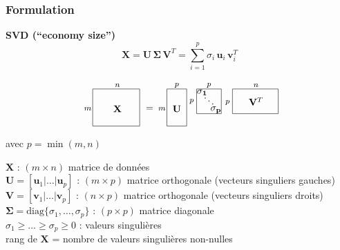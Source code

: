 \documentclass[9pt]{beamer}
\begin{document}
\begin{frame}
\frametitle{Formulation}

\begin{tcolorbox}
\textbf{SVD (``economy size'')}
$$
\mathbf{X} = \mathbf{U} \, \bm{\Sigma} \, \mathbf{V}^T = \sum_{i=1}^p \sigma_i \, \mathbf{u}_i \,  \mathbf{v}_i^T
$$

\[
\raisebox{-0.35\height}{\begin{tikzpicture}[scale=0.9]
\draw(-3,0.7) node (A) {$\mathbf{X}$};
\draw(-4.2,0.7) node (eq) {\footnotesize ${m}$};
\draw(-3,1.65) node (eq) {\footnotesize ${n}$};
\draw(-4.0,0) rectangle (-2.1,1.5);
\draw(-1.7,0.7) node (eq) {${=}$};


\draw(-1,0) rectangle (-0.2,1.5);
\draw(-1.2,0.7) node (eq) {\footnotesize ${m}$};
\draw(-0.6,1.65) node (eq) {\footnotesize ${p}$};
\draw(-0.6,0.7) node (U) {$\mathbf{U}$};

\draw(0.2,0.5) rectangle (1.2,1.5);
\draw(0.42,1.36) node (S) {$\mathbf{\sigma_1}$};
\draw(0.7,1.13) node (S) {$\mathbf{\ddots}$};
\draw(0.98,0.65) node (S) {$\mathbf{\sigma_p}$};
\draw(0,1) node (eq) {\footnotesize ${p}$};\\
\draw(0.7,1.65) node (eq) {\footnotesize ${p}$};


\draw(1.65,0.5) rectangle (3.5,1.5);
\draw(1.45,0.95) node (eq) {\footnotesize ${p}$};
\draw(2.6,1.65) node (eq) {\footnotesize ${n}$};
\draw(2.6,1) node (A) {$\mathbf{V}^{T}$};



\end{tikzpicture}}
\]

avec $p = \min(m,n)$
\end{tcolorbox}

$\mathbf{X}$ : $(m \times n)$  matrice de données\\[1ex]

$\mathbf{U} = [\mathbf{u}_1 | \dots | \mathbf{u}_p ]$ : $(m \times p)$  matrice orthogonale (vecteurs singuliers gauches)\\[1ex]

$\mathbf{V} = [\mathbf{v}_1 | \dots | \mathbf{v}_p ]$ : $(n\times p)$ matrice orthogonale (vecteurs singuliers droits)\\[1ex]

 $\bm{\Sigma} = \text{diag}\{\sigma_1, \dots,  \sigma_p \}$ :  $(p \times p)$   matrice diagonale\\[2ex] 

$\sigma_1 \geq \dots \geq  \sigma_p \geq 0$ : valeurs singulières\\[1ex] 

rang de $\mathbf{X}$ = nombre de valeurs singulières non-nulles

\end{frame}
\end{document}
